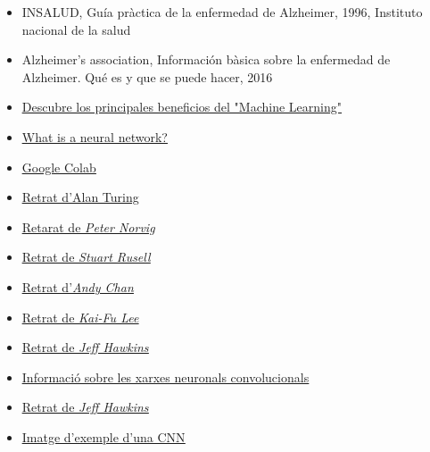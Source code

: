 \documentclass[a4paper,12pt]{article}
\begin{document}
\begin{itemize}
    \item INSALUD, Guía pràctica de la enfermedad de Alzheimer, 1996, Instituto nacional de la salud
    \item Alzheimer’s association, Información bàsica sobre la enfermedad de Alzheimer. Qué es y que se puede hacer, 2016
    \item \href{https://www.iberdrola.com/innovacion/machine-learning-aprendizaje-automatico}{\underline{Descubre los principales beneficios del "Machine Learning"}}
    \item \href{https://aws.amazon.com/es/what-is/neural-network/}{\underline{What is a neural network?}}
    \item \href{https://colab.research.google.com/}{\underline{Google Colab}}
    \item \href{https://upload.wikimedia.org/wikipedia/commons/a/a1/Alan_Turing_Aged_16.jpg}{\underline{Retrat d'Alan Turing}}
    \item \href{https://cs.berkeley.edu/sites/default/files/news_image/peter_norvig_speaking_at_university_of_california_berkeley_2013.jpg}{\underline{Retarat de \textit{Peter Norvig}}}
    \item \href{https://cs.berkeley.edu/sites/default/files/eecs_tout/russell-aqua.jpg}{\underline{Retrat de \textit{Stuart Rusell}}}
    \item \href{https://media.licdn.com/dms/image/C5603AQHgogiTxs2TZg/profile-displayphoto-shrink_800_800/0/1565701087600?e=2147483647&v=beta&t=p5ZjgearbT6mUGtGi2AEwDY07gaEWxmlGYDypO0HUVU}{\underline{Retrat d'\textit{Andy Chan}}}
    \item \href{https://upload.wikimedia.org/wikipedia/commons/0/0d/Capture_medium.jpg}{\underline{Retrat de \textit{Kai-Fu Lee}}}
    \item \href{https://m.media-amazon.com/images/W/IMAGERENDERING_521856-T1/images/S/amzn-author-media-prod/b2a43a485uokuohjp5l7peo9f0.jpg}{\underline{Retrat de \textit{Jeff Hawkins}}}
    \item \href{https://keepcoding.io/blog/redes-neuronales-convolucionales/#Que_son_las_Redes_Neuronales_Convolucionales}{\underline{Informació sobre les xarxes neuronals convolucionals}}
    \item \href{https://m.media-amazon.com/images/S/amzn-author-media-prod/b2a43a485uokuohjp5l7peo9f0._SX450_.jpg}{\underline{Retrat de \textit{Jeff Hawkins}}}
    \item \href{https://editor.analyticsvidhya.com/uploads/25366Convolutional_Neural_Network_to_identify_the_image_of_a_bird.png}{\underline{Imatge d'exemple d'una CNN}}

\end{itemize}
\end{document}

